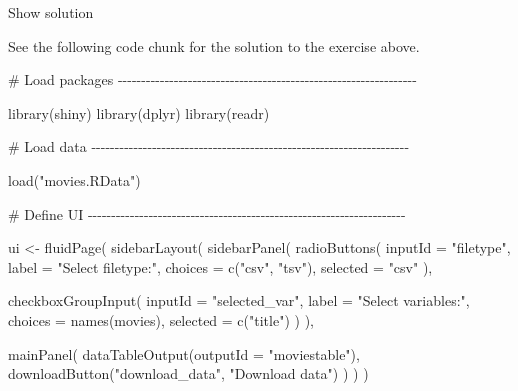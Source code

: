 \documentclass[
  letterpaper,
  DIV=11,
  numbers=noendperiod]{scrreprt}
\newenvironment{Shaded}{\begin{snugshade}}{\end{snugshade}}
\newcommand{\AttributeTok}[1]{\textcolor[rgb]{0.40,0.46,0.14}{#1}}
\newcommand{\CommentTok}[1]{\textcolor[rgb]{0.37,0.37,0.37}{#1}}
\newcommand{\FunctionTok}[1]{\textcolor[rgb]{0.28,0.35,0.67}{#1}}
\newcommand{\NormalTok}[1]{\textcolor[rgb]{0.00,0.46,0.62}{#1}}
\newcommand{\OtherTok}[1]{\textcolor[rgb]{0.00,0.46,0.62}{#1}}
\newcommand{\StringTok}[1]{\textcolor[rgb]{0.13,0.47,0.30}{#1}}
\begin{document}
Show solution

See the following code chunk for the solution to the exercise above.

\begin{Shaded}
\begin{Highlighting}[]
\CommentTok{\# Load packages {-}{-}{-}{-}{-}{-}{-}{-}{-}{-}{-}{-}{-}{-}{-}{-}{-}{-}{-}{-}{-}{-}{-}{-}{-}{-}{-}{-}{-}{-}{-}{-}{-}{-}{-}{-}{-}{-}{-}{-}{-}{-}{-}{-}{-}{-}{-}{-}{-}{-}{-}{-}{-}{-}{-}{-}{-}{-}{-}{-}{-}{-}{-}{-}}

\FunctionTok{library}\NormalTok{(shiny)}
\FunctionTok{library}\NormalTok{(dplyr)}
\FunctionTok{library}\NormalTok{(readr)}

\CommentTok{\# Load data {-}{-}{-}{-}{-}{-}{-}{-}{-}{-}{-}{-}{-}{-}{-}{-}{-}{-}{-}{-}{-}{-}{-}{-}{-}{-}{-}{-}{-}{-}{-}{-}{-}{-}{-}{-}{-}{-}{-}{-}{-}{-}{-}{-}{-}{-}{-}{-}{-}{-}{-}{-}{-}{-}{-}{-}{-}{-}{-}{-}{-}{-}{-}{-}{-}{-}{-}{-}}

\FunctionTok{load}\NormalTok{(}\StringTok{"movies.RData"}\NormalTok{)}

\CommentTok{\# Define UI {-}{-}{-}{-}{-}{-}{-}{-}{-}{-}{-}{-}{-}{-}{-}{-}{-}{-}{-}{-}{-}{-}{-}{-}{-}{-}{-}{-}{-}{-}{-}{-}{-}{-}{-}{-}{-}{-}{-}{-}{-}{-}{-}{-}{-}{-}{-}{-}{-}{-}{-}{-}{-}{-}{-}{-}{-}{-}{-}{-}{-}{-}{-}{-}{-}{-}{-}{-}}

\NormalTok{ui }\OtherTok{\textless{}{-}} \FunctionTok{fluidPage}\NormalTok{(}
  \FunctionTok{sidebarLayout}\NormalTok{(}
    \FunctionTok{sidebarPanel}\NormalTok{(}
      \FunctionTok{radioButtons}\NormalTok{(}
        \AttributeTok{inputId =} \StringTok{"filetype"}\NormalTok{,}
        \AttributeTok{label =} \StringTok{"Select filetype:"}\NormalTok{,}
        \AttributeTok{choices =} \FunctionTok{c}\NormalTok{(}\StringTok{"csv"}\NormalTok{, }\StringTok{"tsv"}\NormalTok{),}
        \AttributeTok{selected =} \StringTok{"csv"}
\NormalTok{      ),}

      \FunctionTok{checkboxGroupInput}\NormalTok{(}
        \AttributeTok{inputId =} \StringTok{"selected\_var"}\NormalTok{,}
        \AttributeTok{label =} \StringTok{"Select variables:"}\NormalTok{,}
        \AttributeTok{choices =} \FunctionTok{names}\NormalTok{(movies),}
        \AttributeTok{selected =} \FunctionTok{c}\NormalTok{(}\StringTok{"title"}\NormalTok{)}
\NormalTok{      )}
\NormalTok{    ),}

    \FunctionTok{mainPanel}\NormalTok{(}
      \FunctionTok{dataTableOutput}\NormalTok{(}\AttributeTok{outputId =} \StringTok{"moviestable"}\NormalTok{),}
      \FunctionTok{downloadButton}\NormalTok{(}\StringTok{"download\_data"}\NormalTok{, }\StringTok{"Download data"}\NormalTok{)}
\NormalTok{    )}
\NormalTok{  )}
\NormalTok{)}


\end{Highlighting}
\end{Shaded}
\end{document}
